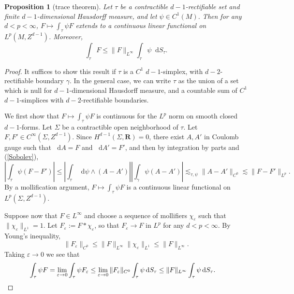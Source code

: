 \documentclass[reqno,11pt]{amsart}
\newcommand{\RR}{\mathbf{R}}
\newcommand*\dif{\mathop{}\!\mathrm{d}}
\newtheorem{proposition}[theorem]{Proposition}
\theoremstyle{definition}
\numberwithin{equation}{section}
\begin{document}
\begin{proposition}[trace theorem]\label{integration is welldefined}
Let $\tau$ be a contractible $d-1$-rectifiable set and finite $d-1$-dimensional Hausdorff measure, and let $\psi \in C^1(M)$.
Then for any $d < p < \infty$, $F \mapsto \int_\tau \psi F$ extends to a continuous linear functional on $L^p(M, Z^{d - 1})$.
Moreover,
\begin{equation}\label{integral over chain is linfinity}
	\int_\tau F \leq \|F\|_{L^\infty} \int_\tau \psi \dif S_\tau.
\end{equation}
\end{proposition}
\begin{proof}
It suffices to show this result if $\tau$ is a $C^1$ $d-1$-simplex, with $d-2$-rectifiable boundary $\gamma$.
In the general case, we can write $\tau$ as the union of a set which is null for $d-1$-dimensional Hausdorff measure, and a countable sum of $C^1$ $d-1$-simplices with $d-2$-rectifiable boundaries. 

We first show that $F \mapsto \int_\tau \psi F$ is continuous for the $L^p$ norm on smooth closed $d-1$-forms.
Let $\Sigma$ be a contractible open neighborhood of $\tau$.
Let $F, F' \in C^\infty(\Sigma, Z^{d - 1})$.
Since $H^{d - 1}(\Sigma, \RR) = 0$, there exist $A, A'$ in Coulomb gauge such that $\dif A = F$ and $\dif A' = F'$, and then by integration by parts and (\ref{Sobolev}),
$$\left|\int_\tau \psi(F - F')\right| \leq \left|\int_\tau \dif \psi \wedge (A - A')\right| \left|\int_\gamma \psi(A - A')\right| \lesssim_{\tau, \psi} \|A - A'\|_{C^0} \lesssim \|F - F'\|_{L^p}.$$
By a mollification argument, $F \mapsto \int_\tau \psi F$ is a continuous linear functional on $L^p(\Sigma, Z^{d - 1})$.

Suppose now that $F \in L^\infty$ and choose a sequence of mollifiers $\chi_\varepsilon$ such that $\|\chi_\varepsilon\|_{L^1} = 1$.
Let $F_\varepsilon := F * \chi_\varepsilon$, so that $F_\varepsilon \to F$ in $L^p$ for any $d < p < \infty$.
By Young's inequality, 
$$\|F_\varepsilon\|_{C^0} \leq \|F\|_{L^\infty} \|\chi_\varepsilon\|_{L^1} \leq \|F\|_{L^\infty}.$$
Taking $\varepsilon \to 0$ we see that
\begin{align*}
\int_\tau \psi F 
&= \lim_{\varepsilon \to 0} \int_\tau \psi F_\varepsilon \leq \lim_{\varepsilon \to 0} \|F_\varepsilon\|_{C^0} \int_\tau \psi \dif S_\tau \leq \|F\|_{L^\infty} \int_\tau \psi \dif S_\tau. \qedhere
\end{align*}
\end{proof}
\end{document}
